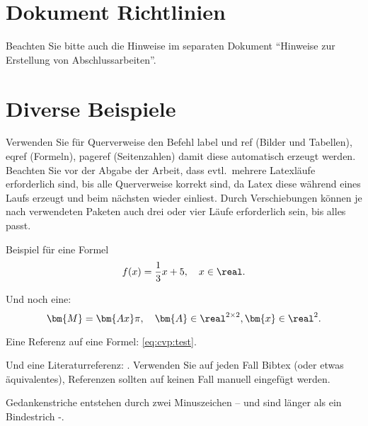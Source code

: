 \section{Dokument Richtlinien}
Beachten Sie bitte auch die Hinweise im separaten Dokument "`Hinweise zur Erstellung von Abschlussarbeiten"'.

\section{Diverse Beispiele}

Verwenden Sie für Querverweise den Befehl label und  ref (Bilder und Tabellen), eqref (Formeln), pageref (Seitenzahlen) damit diese automatisch erzeugt werden.
Beachten Sie vor der Abgabe der Arbeit, dass evtl.\ mehrere Latexläufe erforderlich sind, bis alle Querverweise korrekt sind, da Latex diese während eines Laufs erzeugt und beim nächsten wieder einliest.
Durch Verschiebungen können je nach verwendeten Paketen auch drei oder vier Läufe erforderlich sein, bis alles passt.



Beispiel für eine Formel
\begin{equation}
	\label{eq:cvp:test}
	f(x) = \frac{1}{3} x + 5, \quad x \in \real.
\end{equation}

Und noch eine:
\begin{equation}
	\label{eq:cvp:matvec}
	\bm{M}  = \bm{Ax} \pi, \quad \bm{A} \in \real^{2 \times 2}, \bm{x} \in \real^2.
\end{equation}

Eine Referenz auf eine Formel: \eqref{eq:cvp:test}.

Und eine Literaturreferenz: \cite{wombat2016}.
Verwenden Sie auf jeden Fall Bibtex (oder etwas äquivalentes), Referenzen sollten auf keinen Fall manuell eingefügt werden.

Gedankenstriche entstehen durch zwei Minuszeichen -- und sind länger als ein Bindestrich -.


